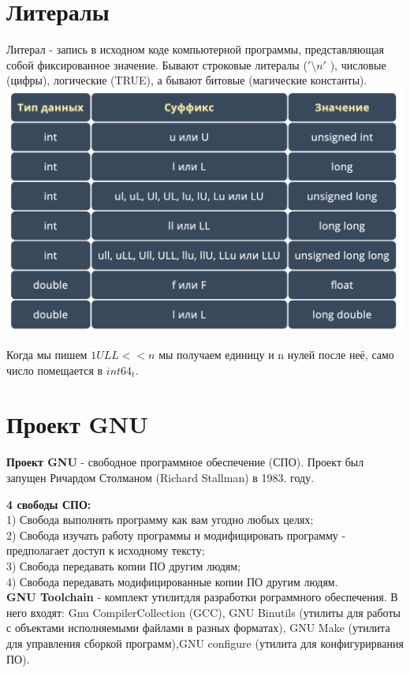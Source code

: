 \documentclass[12pt]{article}
\begin{document}
  \section{Литералы}
 Литерал  - запись в исходном коде компьютерной программы, представляющая собой фиксированное значение. Бывают строковые литералы ($'\setminus n'$ ), числовые (цифры), логические (TRUE), а бывают битовые (магические константы). \\
 \includegraphics[scale=0.5]{./pic02.png} 
 
 Когда мы пишем $1ULL << n$ мы получаем единицу и n нулей после неё, само число помещается в $int64_t.$
 
 \section{Проект GNU}
 \textbf{Проект GNU} - свободное программное обеспечение (СПО). Проект был запущен Ричардом Столманом (Richard Stallman) в 1983. году.
 
 \textbf{4 свободы СПО:} \\
 1) Свобода выполнять программу как вам угодно  любых целях; \\
 2) Свобода изучать работу программы и модифицировать программу - предполагает доступ к исходному тексту; \\
 3) Свобода передавать копии ПО другим людям; \\
 4) Свобода передавать модифицированные копии ПО другим людям.
 \\ 
 \textbf{GNU Toolchain} - комплект утилитдля разработки рограммного обеспечения. В него входят: Gnu CompilerCollection (GCC), GNU Binutils (утилиты для работы с объектами  исполняемыми файлами в разных форматах), GNU Make (утилита для управления сборкой программ),GNU configure (утилита для конфигурирвания ПО). \\
 
\end{document}
